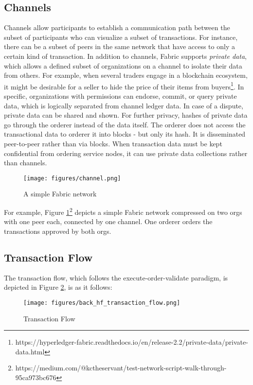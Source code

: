 \documentclass[12pt,a4paper]{article}
\theoremstyle{definition}
\begin{document}
\subsection{Channels}
Channels allow participants to establish a communication path between the subset of participants who can visualize a subset of transactions. For instance, there can be a subset of peers in the same network that have access to only a certain kind of transaction.  In addition to channels, Fabric supports \textit{private data}, which allows a defined subset of organizations on a channel to isolate their data from others. For example, when several traders engage in a blockchain ecosystem, it might be desirable for a seller to hide the price of their items from buyers\footnote{https://hyperledger-fabric.readthedocs.io/en/release-2.2/private-data/private-data.html}. In specific, organizations with permissions can endorse, commit, or query private data, which is logically separated from channel ledger data.  In case of a dispute, private data can be shared and shown. For further privacy, hashes of private data go through the orderer instead of the data itself. The orderer does not access the transactional data to orderer it into blocks - but only its hash. It is disseminated peer-to-peer rather than via blocks. When transaction data must be kept confidential from ordering service nodes, it can use private data collections rather than channels.

\begin{figure}[H]

\texttt{[image: figures/channel.png]}
\centering
\caption{A simple Fabric network}
\label{fig:channel}
\end{figure}


For example, Figure \ref{fig:channel}\footnote{https://medium.com/@kctheservant/test-network-script-walk-through-95ca973bc676} depicts a simple Fabric network compressed on two orgs with one peer each, connected by one channel. One orderer orders the transactions approved by both orgs.



\subsection{Transaction Flow}
The transaction flow, which follows the execute-order-validate paradigm, is depicted in Figure \ref{fig: Fabric's Transaction Flow}, is as it follows:

\begin{figure}[]
\texttt{[image: figures/back\_hf\_transaction\_flow.png]}
\centering
\caption{Transaction Flow \cite{fabric}}
\label{fig: Fabric's Transaction Flow}
\end{figure}
\end{document}
